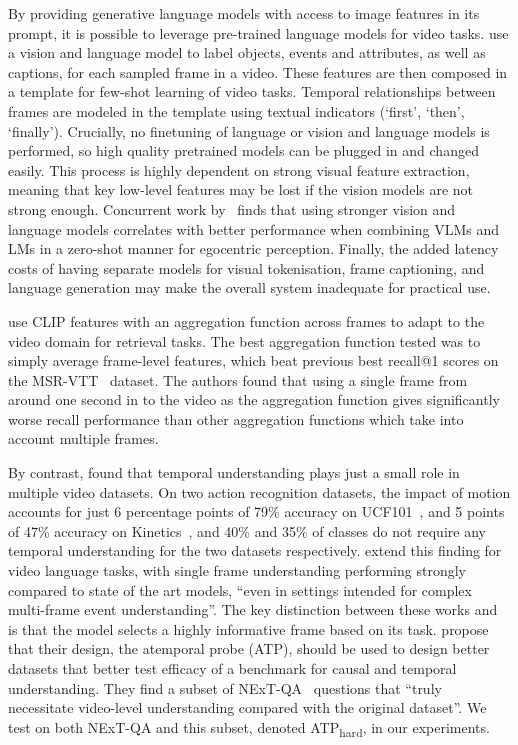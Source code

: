 By providing generative language models with access to image features in its
prompt, it is possible to leverage pre-trained language models for video tasks.
\citet{wang2022vidil} use a vision and language model to label objects, events
and attributes, as well as captions, for each sampled frame in a video. These
features are then composed in a template for few-shot learning of video tasks.
Temporal relationships between frames are modeled in the template using textual
indicators (`first', `then', `finally'). Crucially, no finetuning of language
or vision and language models is performed, so high quality pretrained models
can be plugged in and changed easily. This process is highly dependent on
strong visual feature extraction, meaning that key low-level features may be
lost if the vision models are not strong enough. Concurrent work
by~\citet{zeng2023socratic} finds that using stronger vision and language
models correlates with better performance when combining VLMs and LMs in a
zero-shot manner for egocentric perception. Finally, the added latency costs of
having separate models for visual tokenisation, frame captioning, and language
generation may make the overall system inadequate for practical use.

\citet{portilloquintero2021clipvidret} use CLIP features with an aggregation
function across frames to adapt to the video domain for retrieval tasks. The best
aggregation function tested was to simply average frame-level features, which
beat previous best recall@1 scores on the MSR-VTT~\citep{xu2016msr-vtt} dataset.
The authors found that using a single frame from around one second in to the
video as the aggregation function gives significantly worse recall performance
than other aggregation functions which take into account multiple frames.

By contrast, \citet{huang2018videotemporal} found that temporal understanding
plays just a small role in multiple video datasets. On two action recognition
datasets, the impact of motion accounts for just 6 percentage points of 79\%
accuracy on UCF101~\citep{soomro2012ucf101}, and 5 points of 47\% accuracy on
Kinetics~\citep{carreira2018kinetics600}, and 40\% and 35\% of classes do not
require any temporal understanding for the two datasets respectively.
\citet{buch2022revisiting} extend this finding for video language tasks, with
single frame understanding performing strongly compared to state of the art
models, ``even in settings intended for complex multi-frame event
understanding''. The key distinction between these works
and~\citet{portilloquintero2021clipvidret} is that the model selects a highly
informative frame based on its task. \citet{buch2022revisiting} propose that
their design, the atemporal probe (ATP), should be used to design better
datasets that better test efficacy of a benchmark for causal and temporal
understanding. They find a subset of NExT-QA~\citep{xiao2021nextqa} questions
that ``truly necessitate video-level understanding compared with the original
dataset''. We test on both NExT-QA and this subset, denoted
ATP\textsubscript{hard}, in our experiments.

